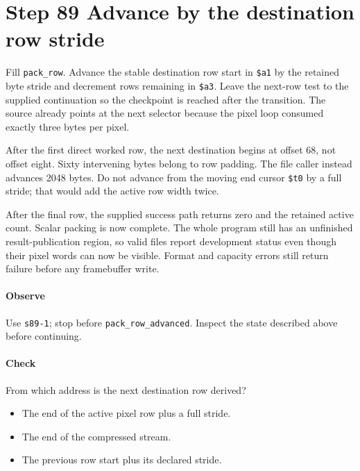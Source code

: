 \section{Step 89 Advance by the destination row stride}
Fill \texttt{pack\_row}. Advance the stable destination row start in \texttt{\$a1} by the retained byte stride and decrement rows remaining in \texttt{\$a3}. Leave the next-row test to the supplied continuation so the checkpoint is reached after the transition. The source already points at the next selector because the pixel loop consumed exactly three bytes per pixel.

After the first direct worked row, the next destination begins at offset 68, not offset eight. Sixty intervening bytes belong to row padding. The file caller instead advances 2048 bytes. Do not advance from the moving end cursor \texttt{\$t0} by a full stride; that would add the active row width twice.

After the final row, the supplied success path returns zero and the retained active count. Scalar packing is now complete. The whole program still has an unfinished result-publication region, so valid files report development status even though their pixel words can now be visible. Format and capacity errors still return failure before any framebuffer write.

\paragraph{Observe} Use \texttt{s89-1}; stop before \texttt{pack\_row\_advanced}. Inspect the state described above before continuing.

\paragraph{Check} From which address is the next destination row derived?
\begin{itemize}
  \item[A.] The end of the active pixel row plus a full stride.
  \item[B.] The end of the compressed stream.
  \item[C.] The previous row start plus its declared stride.
\end{itemize}

